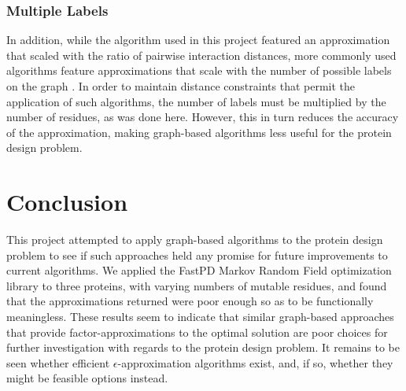 \documentclass[11pt]{article}
\begin{document}
	\subsubsection{Multiple Labels}
	In addition, while the algorithm used in this project featured an approximation
	that scaled with the ratio of pairwise interaction distances, more commonly 
	used algorithms feature approximations that scale with the number of possible
	labels on the graph \cite{BVZ1}. In order to maintain distance constraints that
	permit the application of such algorithms, the number of labels must be 
	multiplied by the number of residues, as was done here. However, this in turn
	reduces the accuracy of the approximation, making graph-based algorithms less
	useful for the protein design problem. 	
	
	\section{Conclusion}
	This project attempted to apply graph-based algorithms to the protein design
	problem to see if such approaches held any promise for future improvements
	to current algorithms. We applied the FastPD Markov Random Field optimization
	library to three proteins, with varying numbers of mutable residues, and found
	that the approximations returned were poor enough so as to be functionally
	meaningless. These results seem to indicate that similar graph-based approaches
	that provide factor-approximations to the optimal solution are poor choices for
	further investigation with regards to the protein design problem. It remains
	to be seen whether efficient $\epsilon$-approximation algorithms exist, and,
	if so, whether they might be feasible options instead. 
	
\end{document}
